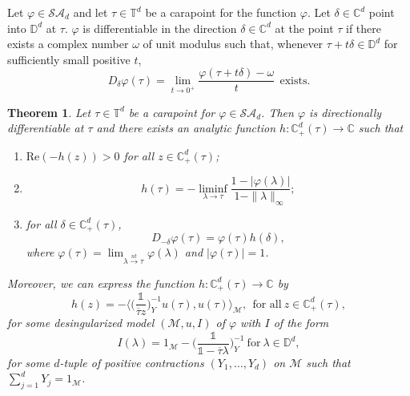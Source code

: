 \documentclass[11pt, reqno]{amsart}
\newtheorem{theorem}{Theorem}[section]
\newcommand\1{\boldsymbol {1}}
\numberwithin{equation}{section}
\begin{document}
 Let $\varphi\in\mathcal{SA}_{d}$ and let $\tau\in\mathbb{T}^{d}$ be a carapoint for the function $\varphi$. Let $\delta\in\mathbb{C}^{d}$ point into $\mathbb{D}^{d}$ at $\tau$. $\varphi$ is differentiable in the direction $\delta\in\mathbb{C}^{d}$ at the point $\tau$ if there exists a complex number $\omega$ of unit modulus such that, whenever $\tau+t \delta\in\mathbb{D}^{d}$ for sufficiently small positive $t$, 
$$D_{\delta}\varphi(\tau)=\lim_{t\rightarrow 0^{+}} \dfrac{\varphi(\tau+t\delta)-\omega}{t}~~{\text{exists}}.$$
\begin{theorem}\label{directionalderivtheorem}
  Let $\tau\in\mathbb{T}^{d}$ be a carapoint for $\varphi\in\mathcal{SA}_{d}$. 
Then  $\varphi$ is directionally differentiable at $\tau$ and 
there exists an analytic function $h:\mathbb{C}_{+}^{d}(\tau)\rightarrow\mathbb{C}$ such that
    \begin{enumerate}
        \item $\mathrm{Re}(-h(z))>0$ for all $ z\in\mathbb{C}_{+}^{d}(\tau)$;
        \item \begin{equation}\label{hfunction}
            h(\tau) = -\liminf_{\lambda{\rightarrow}\tau} \dfrac{1-\lvert \varphi(\lambda)\rvert}{1-\|\lambda \|_{\infty}};
        \end{equation}
        \item for all $ \delta\in\mathbb{C}_{+}^{d}(\tau)$, 
        \begin{equation}\label{directionalderivativeD}
        D_{- \delta}\varphi(\tau) = \varphi(\tau)h( \delta),
\end{equation}
where $ \varphi(\tau) = \lim_{\lambda{\overset{nt}\rightarrow}\tau}\varphi(\lambda)$ and $|\varphi(\tau)|=1$.
    \end{enumerate}
Moreover, we can express the function $h:\mathbb{C}_{+}^{d}(\tau)\rightarrow\mathbb{C}$ by
$$ h( z) = -\bigg\langle \bigg(\dfrac{\mathds{1}}{\overline{\tau} z}\bigg)_{Y}^{-1}u(\tau),u(\tau)\bigg\rangle_{\mathcal{M}},~~\text{for all}~ z\in\mathbb{C}_{+}^{d}(\tau),$$  
for some desingularized model $(\mathcal{M},u,I)$ of $\varphi$ with $I$ of the form
\begin{equation}\label{Ioperatorgeneralizedmodel-2}
I(\lambda) = 1_{\mathcal{M}} - \bigg( \dfrac{\mathds{1}}{\mathds{1}-\overline{\tau}\lambda}\bigg)_{Y}^{-1} \
\text{for} \ \lambda \in \mathbb{D}^{d},
\end{equation}
for some $d$-tuple of positive contractions $(Y_{1},\hdots,Y_{d})$ on $\mathcal{M}$ such that $\sum_{j=1}^{d}Y_{j}=1_{\mathcal{M}}$. 
\end{theorem}
\end{document}
